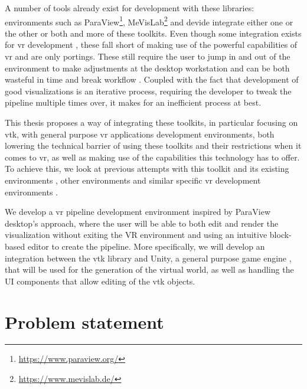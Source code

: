 A number of tools already exist for development with these libraries: environments such as ParaView\footnote{\url{https://www.paraview.org/}}, MeVisLab\footnote{\url{https://www.mevislab.de/}} and \acrfull{devide} \cite{botha_devide_2004} integrate either one or the other or both and more of these toolkits. Even though some integration exists for \acrshort{vr} development \cite{sua_virtual_2015, shetty_immersive_2011}, these fall short of making use of the powerful capabilities of \acrshort{vr} and are only portings. These still require the user to jump in and out of the environment to make adjustments at the desktop workstation and can be both wasteful in time and break workflow \cite{belleman_interactive_2003, dreuning_visual_2016, kruis_creating_2017, schutte_virtual_2018}. Coupled with the fact that development of good visualizations is an iterative process, requiring the developer to tweak the pipeline multiple times over, it makes for an inefficient process at best.

This thesis proposes a way of integrating these toolkits, in particular focusing on \acrshort{vtk}, with general purpose \acrshort{vr} applications development environments, both lowering the technical barrier of using these toolkits and their restrictions when it comes to \acrshort{vr}, as well as making use of the capabilities this technology has to offer. To achieve this, we look at previous attempts with this toolkit and its existing environments \cite{dreuning_visual_2016, kruis_creating_2017, schutte_virtual_2018}, other environments \cite{wheeler_virtual_2018} and similar specific \acrshort{vr} development environments \cite{vanhorn_deep_2019}.

We develop a \acrshort{vr} pipeline development environment inspired by ParaView desktop's approach, where the user will be able to both edit and render the visualization without exiting the VR environment and using an intuitive block-based editor to create the pipeline. More specifically, we will develop an integration between the \acrshort{vtk} library and Unity, a general purpose game engine \cite{haas2014history}, that will be used for the generation of the virtual world, as well as handling the UI components that allow editing of the \acrshort{vtk} objects.

\section{Problem statement}

